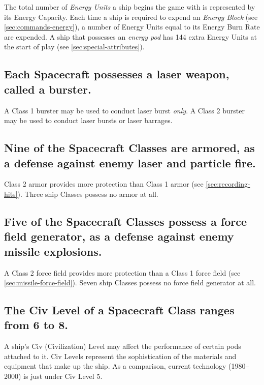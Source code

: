 The total number of \emph{Energy Units} a ship begins the game with is
represented by its Energy Capacity. Each time a ship is required to
expend an \emph{Energy Block} (see \ref{sec:commands-energy}), a number of
Energy Units equal to its Energy Burn Rate are expended. A ship that
possesses an \emph{energy pod} has 144 extra Energy Units at the start
of play (see \ref{sec:special-attributes}).

\subsection[Burster]{Each Spacecraft possesses a laser weapon, called a
  burster.}
\label{sec:burster}



A Class 1 burster may be used to conduct laser burst \emph{only}. A
Class 2 burster may be used to conduct laser bursts or laser barrages.


\subsection[Armor]{Nine of the Spacecraft Classes are armored, as a defense
  against enemy laser and particle fire.}
\label{sec:armor}

Class 2 armor provides more protection than Class 1 armor (see
\ref{sec:recording-hits}). Three ship Classes possess no armor at all.


\subsection[Force Field]{Five of the Spacecraft Classes possess a
  force field generator, as a defense against enemy missile  
  explosions.}
\label{sec:force-field}


A Class 2 force field provides more protection than a Class 1 force
field (see \ref{sec:missile-force-field}). Seven ship Classes possess
no force field generator at all.


\subsection[Civ Level]{The Civ Level of a Spacecraft Class ranges from
  6 to 8.}
\label{sec:civ-level-spacecraft}



A ship's Civ (Civilization) Level may affect the performance of
certain pods attached to it. Civ Levels represent the sophistication
of the materials and equipment that make up the ship. As a comparison,
current technology (1980--2000) is just under Civ Level 5.


